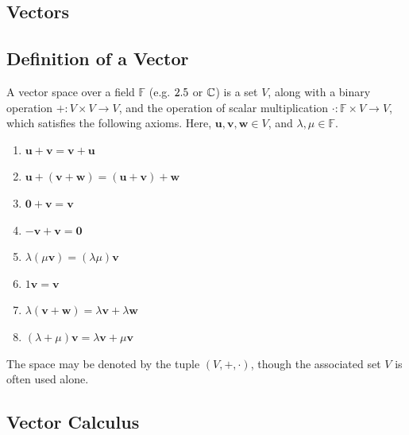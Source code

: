 \documentclass[a4paper,12pt]{article}
\begin{document}
\printbibliography


\begin{appendices}

\section{Vectors} \label{appendix:vectors}

\subsection{Definition of a Vector} \label{appendix:vector_space}

A vector space over a field $\mathbb{F}$ (e.g. $2.5$ or $\mathbb{C}$) is a set $V$, along with a binary operation $+ \colon V \times V \to V$, and the operation of scalar multiplication $\cdot \colon \mathbb{F} \times V \to V$, which satisfies the following axioms.
Here, $\mathbf{u}, \mathbf{v}, \mathbf{w} \in V$, and $\lambda, \mu \in \mathbb{F}$.
\begin{enumerate}
\item $\mathbf{u} + \mathbf{v} = \mathbf{v} + \mathbf{u}$
\item $\mathbf{u} + (\mathbf{v} + \mathbf{w}) = (\mathbf{u} + \mathbf{v}) + \mathbf{w}$
\item $\mathbf{0} + \mathbf{v} = \mathbf{v}$
\item $-\mathbf{v} + \mathbf{v} = \mathbf{0}$
\item $\lambda(\mu\mathbf{v}) = (\lambda\mu)\mathbf{v}$
\item $1\mathbf{v} = \mathbf{v}$
\item $\lambda(\mathbf{v} + \mathbf{w}) = \lambda\mathbf{v} + \lambda\mathbf{w}$
\item $(\lambda + \mu)\mathbf{v} = \lambda\mathbf{v} + \mu\mathbf{v}$
\end{enumerate}
The space may be denoted by the tuple $(V, +, \cdot)$, though the associated set $V$ is often used alone.

\subsection{Vector Calculus} \label{appendix:vector calculus}


\end{appendices}
\end{document}
